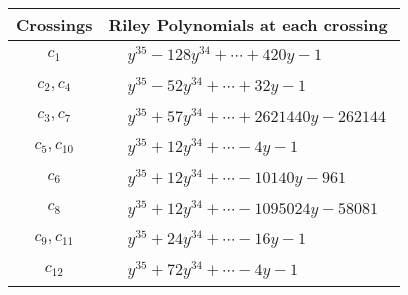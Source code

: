 \documentclass[1p]{elsarticle_modified}
\theoremstyle{definition}
\begin{document}
\begin{tabular}{m{50pt}|m{274pt}}
Crossings & \hspace{64pt}Riley Polynomials at each crossing \\
\hline $$\begin{aligned}c_{1}\end{aligned}$$&$\begin{aligned}
&y^{35}-128 y^{34}+\cdots+420 y-1
\end{aligned}$\\
\hline $$\begin{aligned}c_{2},c_{4}\end{aligned}$$&$\begin{aligned}
&y^{35}-52 y^{34}+\cdots+32 y-1
\end{aligned}$\\
\hline $$\begin{aligned}c_{3},c_{7}\end{aligned}$$&$\begin{aligned}
&y^{35}+57 y^{34}+\cdots+2621440 y-262144
\end{aligned}$\\
\hline $$\begin{aligned}c_{5},c_{10}\end{aligned}$$&$\begin{aligned}
&y^{35}+12 y^{34}+\cdots-4 y-1
\end{aligned}$\\
\hline $$\begin{aligned}c_{6}\end{aligned}$$&$\begin{aligned}
&y^{35}+12 y^{34}+\cdots-10140 y-961
\end{aligned}$\\
\hline $$\begin{aligned}c_{8}\end{aligned}$$&$\begin{aligned}
&y^{35}+12 y^{34}+\cdots-1095024 y-58081
\end{aligned}$\\
\hline $$\begin{aligned}c_{9},c_{11}\end{aligned}$$&$\begin{aligned}
&y^{35}+24 y^{34}+\cdots-16 y-1
\end{aligned}$\\
\hline $$\begin{aligned}c_{12}\end{aligned}$$&$\begin{aligned}
&y^{35}+72 y^{34}+\cdots-4 y-1
\end{aligned}$\\
\hline
\end{tabular}\\~\\
\end{document}
